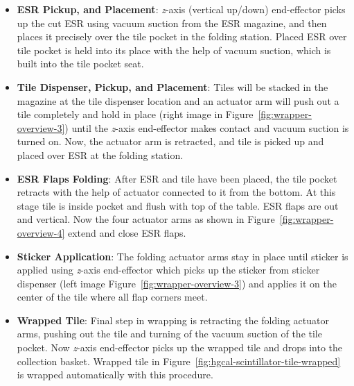 \begin{itemize}
  \item \textbf{ESR Pickup, and Placement}: \textit{z}-axis (vertical up/down) end-effector
        picks up the cut \gls{ESR} using vacuum suction from the \gls{ESR} magazine,
        and then places it precisely over the tile pocket in the folding station.
        Placed \gls{ESR} over tile pocket is held into its place with
        the help of vacuum suction, which is built into the tile pocket
        seat.
  \item \textbf{Tile Dispenser, Pickup, and Placement}:
        Tiles will be stacked in the magazine at the tile dispenser
        location and an actuator arm will push out a tile
        completely and hold in place (right image in Figure~\ref{fig:wrapper-overview-3}) until the \textit{z}-axis end-effector
        makes contact and vacuum suction is turned on. Now,
        the actuator arm is retracted, and tile is
        picked up and placed over \gls{ESR} at the folding station.
  \item \textbf{ESR Flaps Folding}:
        After \gls{ESR} and tile have been placed, the tile pocket
        retracts with the help of actuator connected to it from the bottom.
        At this stage tile is inside pocket and flush with top of the table.
        \gls{ESR} flaps are out and vertical.
        Now the four actuator arms as shown in Figure~\ref{fig:wrapper-overview-4}
        extend and close \gls{ESR} flaps.
  \item \textbf{Sticker Application}:
        The folding actuator arms stay in place until sticker is
        applied using \textit{z}-axis end-effector which
        picks up the sticker from sticker dispenser (left image Figure~\ref{fig:wrapper-overview-3}) and applies it on
        the center of the tile where all flap corners meet.
  \item \textbf{Wrapped Tile}:
        Final step in wrapping is retracting the folding actuator arms,
        pushing out the tile and turning of the vacuum suction of the tile pocket.
        Now \textit{z}-axis end-effector picks up the wrapped tile and
        drops into the collection basket.
        Wrapped tile in Figure~\ref{fig:hgcal-scintillator-tile-wrapped}
        is wrapped automatically with this procedure.
\end{itemize}

